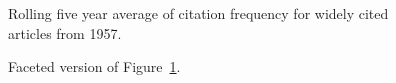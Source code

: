\documentclass[
  10pt,
  letterpaper,
  DIV=11,
  numbers=noendperiod,
  twoside]{scrartcl}
\begin{document}
\begin{figure}


\caption{\label{fig-citation-spaghetti-1957}Rolling five year average of
citation frequency for widely cited articles from 1957.}

\end{figure}%

\begin{figure}


\caption{\label{fig-citation-facet-1957}Faceted version of
Figure~\ref{fig-citation-spaghetti-1957}.}

\end{figure}%
\end{document}
